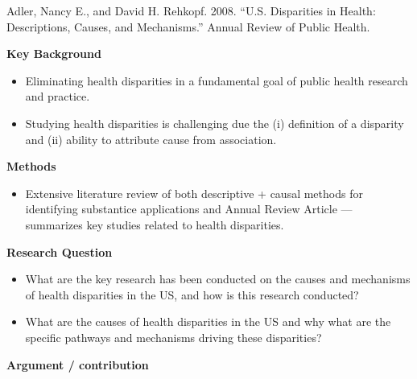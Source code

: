 \documentclass[
]{book}
\providecommand{\tightlist}{%
  \setlength{\itemsep}{0pt}\setlength{\parskip}{0pt}}
\begin{document}
Adler, Nancy E., and David H. Rehkopf. 2008. ``U.S. Disparities in Health: Descriptions, Causes, and Mechanisms.'' Annual Review of Public Health.

\textbf{Key Background}

\begin{itemize}
\tightlist
\item
  Eliminating health disparities in a fundamental goal of public health research and practice.
\item
  Studying health disparities is challenging due the (i) definition of a disparity and (ii) ability to attribute cause from association.
\end{itemize}

\textbf{Methods}

\begin{itemize}
\tightlist
\item
  Extensive literature review of both descriptive + causal methods for identifying substantice applications and Annual Review Article --- summarizes key studies related to health disparities.
\end{itemize}

\textbf{Research Question}

\begin{itemize}
\tightlist
\item
  What are the key research has been conducted on the causes and mechanisms of health disparities in the US, and how is this research conducted?
\item
  What are the causes of health disparities in the US and why what are the specific pathways and mechanisms driving these disparities?
\end{itemize}

\textbf{Argument / contribution}
\end{document}
